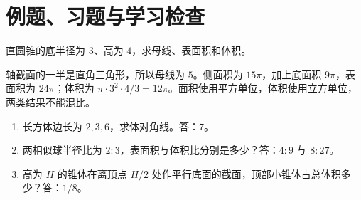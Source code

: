 \section{例题、习题与学习检查}
\begin{example}
直圆锥的底半径为 $3$、高为 $4$，求母线、表面积和体积。
\end{example}
\begin{solve}
轴截面的一半是直角三角形，所以母线为 $5$。侧面积为 $15\pi$，加上底面积 $9\pi$，表面积为 $24\pi$；体积为 $\pi\cdot3^2\cdot4/3=12\pi$。面积使用平方单位，体积使用立方单位，两类结果不能混比。
\end{solve}
\begin{enumerate}
\item 长方体边长为 $2,3,6$，求体对角线。答：$7$。
\item 两相似球半径比为 $2:3$，表面积与体积比分别是多少？答：$4:9$ 与 $8:27$。
\item 高为 $H$ 的锥体在离顶点 $H/2$ 处作平行底面的截面，顶部小锥体占总体积多少？答：$1/8$。
\end{enumerate}

